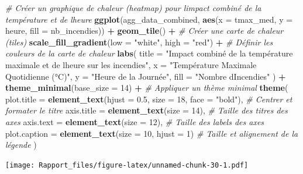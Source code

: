 \documentclass[
]{article}
\newenvironment{Shaded}{\begin{snugshade}}{\end{snugshade}}
\newcommand{\AttributeTok}[1]{\textcolor[rgb]{0.13,0.29,0.53}{#1}}
\newcommand{\CommentTok}[1]{\textcolor[rgb]{0.56,0.35,0.01}{\textit{#1}}}
\newcommand{\DecValTok}[1]{\textcolor[rgb]{0.00,0.00,0.81}{#1}}
\newcommand{\FloatTok}[1]{\textcolor[rgb]{0.00,0.00,0.81}{#1}}
\newcommand{\FunctionTok}[1]{\textcolor[rgb]{0.13,0.29,0.53}{\textbf{#1}}}
\newcommand{\NormalTok}[1]{#1}
\newcommand{\SpecialCharTok}[1]{\textcolor[rgb]{0.81,0.36,0.00}{\textbf{#1}}}
\newcommand{\StringTok}[1]{\textcolor[rgb]{0.31,0.60,0.02}{#1}}
\begin{document}
\begin{Shaded}
\begin{Highlighting}[]
\CommentTok{\# Créer un graphique de chaleur (heatmap) pour l\textquotesingle{}impact combiné de la température et de l\textquotesingle{}heure}
\FunctionTok{ggplot}\NormalTok{(agg\_data\_combined, }\FunctionTok{aes}\NormalTok{(}\AttributeTok{x =}\NormalTok{ tmax\_med, }\AttributeTok{y =}\NormalTok{ heure, }\AttributeTok{fill =}\NormalTok{ nb\_incendies)) }\SpecialCharTok{+}
  \FunctionTok{geom\_tile}\NormalTok{() }\SpecialCharTok{+}  \CommentTok{\# Créer une carte de chaleur (tiles)}
  \FunctionTok{scale\_fill\_gradient}\NormalTok{(}\AttributeTok{low =} \StringTok{"white"}\NormalTok{, }\AttributeTok{high =} \StringTok{"red"}\NormalTok{) }\SpecialCharTok{+}  \CommentTok{\# Définir les couleurs de la carte de chaleur}
  \FunctionTok{labs}\NormalTok{(}
    \AttributeTok{title =} \StringTok{"Impact combiné de la température maximale et de l\textquotesingle{}heure sur les incendies"}\NormalTok{,}
    \AttributeTok{x =} \StringTok{"Température Maximale Quotidienne (°C)"}\NormalTok{,}
    \AttributeTok{y =} \StringTok{"Heure de la Journée"}\NormalTok{,}
    \AttributeTok{fill =} \StringTok{"Nombre d\textquotesingle{}Incendies"}
\NormalTok{  ) }\SpecialCharTok{+}
  \FunctionTok{theme\_minimal}\NormalTok{(}\AttributeTok{base\_size =} \DecValTok{14}\NormalTok{) }\SpecialCharTok{+}  \CommentTok{\# Appliquer un thème minimal}
  \FunctionTok{theme}\NormalTok{(}
    \AttributeTok{plot.title =} \FunctionTok{element\_text}\NormalTok{(}\AttributeTok{hjust =} \FloatTok{0.5}\NormalTok{, }\AttributeTok{size =} \DecValTok{18}\NormalTok{, }\AttributeTok{face =} \StringTok{"bold"}\NormalTok{),  }\CommentTok{\# Centrer et formater le titre}
    \AttributeTok{axis.title =} \FunctionTok{element\_text}\NormalTok{(}\AttributeTok{size =} \DecValTok{14}\NormalTok{),                               }\CommentTok{\# Taille des titres des axes}
    \AttributeTok{axis.text =} \FunctionTok{element\_text}\NormalTok{(}\AttributeTok{size =} \DecValTok{12}\NormalTok{),                                }\CommentTok{\# Taille des labels des axes}
    \AttributeTok{plot.caption =} \FunctionTok{element\_text}\NormalTok{(}\AttributeTok{size =} \DecValTok{10}\NormalTok{, }\AttributeTok{hjust =} \DecValTok{1}\NormalTok{)                   }\CommentTok{\# Taille et alignement de la légende}
\NormalTok{  )}
\end{Highlighting}
\end{Shaded}

\texttt{[image: Rapport\_files/figure-latex/unnamed-chunk-30-1.pdf]}
\end{document}
